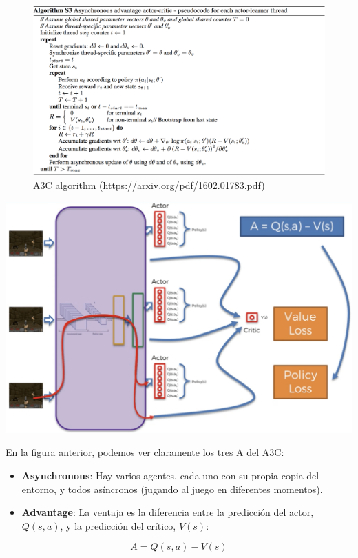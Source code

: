 \documentclass[
]{book}
\begin{document}
\begin{figure}
\centering
\includegraphics{Images/S3.png}
\caption{A3C algorithm (\url{https://arxiv.org/pdf/1602.01783.pdf})}
\end{figure}

\includegraphics{Images/A3C.png}

En la figura anterior, podemos ver claramente los tres A del A3C:

\begin{itemize}
\item
  \textbf{Asynchronous}: Hay varios agentes, cada uno con su propia copia del entorno, y todos asíncronos (jugando al juego en diferentes momentos).
\item
  \textbf{Advantage}: La ventaja es la diferencia entre la predicción del actor, \(Q(s, a)\), y la predicción del crítico, \(V(s)\):
\end{itemize}

\[A = Q(s,a) - V(s)\]
\end{document}
